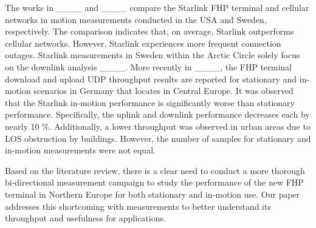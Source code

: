 The works in ____ and ____ compare the Starlink FHP terminal and cellular networks in motion measurements conducted in the USA and Sweden, respectively. The comparison indicates that, on average, Starlink outperforms cellular networks. However, Starlink experiences more frequent connection outages. Starlink measurements in Sweden within the Arctic Circle solely focus on the downlink analysis ____. More recently in ____, the FHP terminal download and upload UDP throughput results are reported for stationary and in-motion scenarios in Germany that locates in Central Europe. It was observed that the Starlink in-motion performance is significantly worse than stationary performance. Specifically, the uplink and downlink performance decreases each by nearly 10 \%. Additionally, a lower throughput was observed in urban areas due to LOS obstruction by buildings. However, the number of samples for stationary and in-motion measurements were not equal.

Based on the literature review, there is a clear need to conduct a more thorough bi-directional measurement campaign to study the performance of the new FHP terminal in Northern Europe for both stationary and in-motion use. Our paper addresses this shortcoming with measurements to better understand its throughput and usefulness for applications.


